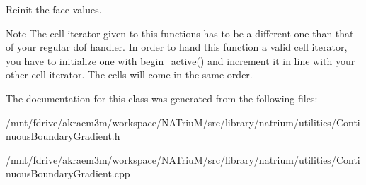 Reinit the face values. \begin{DoxyNote}{Note}
The cell iterator given to this functions has to be a different one than that of your regular dof handler. In order to hand this function a valid cell iterator, you have to initialize one with \hyperlink{classnatrium_1_1ContinuousBoundaryGradient_aeb8d2aa8290ea70e51f4904573541a8f}{begin\_\-active()} and increment it in line with your other cell iterator. The cells will come in the same order. 
\end{DoxyNote}


The documentation for this class was generated from the following files:\begin{DoxyCompactItemize}
\item 
/mnt/fdrive/akraem3m/workspace/NATriuM/src/library/natrium/utilities/ContinuousBoundaryGradient.h\item 
/mnt/fdrive/akraem3m/workspace/NATriuM/src/library/natrium/utilities/ContinuousBoundaryGradient.cpp\end{DoxyCompactItemize}
